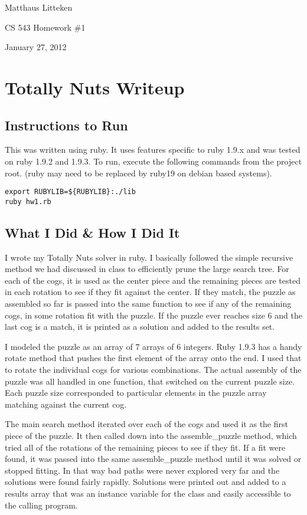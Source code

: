 \documentclass{article}
\begin{document}
\hfill Matthaus Litteken

\hfill CS 543 Homework \#1

\hfill January 27, 2012\\
\section{Totally Nuts Writeup}
\subsection{Instructions to Run}
This was written using ruby. It uses features specific to ruby 1.9.x and was tested on ruby 1.9.2 and 1.9.3. To run, execute the following commands from the project root. (ruby may need to be replaced by ruby19 on debian based systems).
\begin{verbatim}
export RUBYLIB=${RUBYLIB}:./lib
ruby hw1.rb
\end{verbatim}
\subsection{What I Did \& How I Did It}
I wrote my Totally Nuts solver in ruby. I basically followed the simple recursive method we had discussed in class to efficiently prune the large search tree. For each of the cogs, it is used as the center piece and the remaining pieces are tested in each rotation to see if they fit against the center. If they match, the puzzle as assembled so far is passed into the same function to see if any of the remaining cogs, in some rotation fit with the puzzle. If the puzzle ever reaches size 6 and the last cog is a match, it is printed as a solution and added to the results set.

I modeled the puzzle as an array of 7 arrays of 6 integers. Ruby 1.9.3 has a handy rotate method that pushes the first element of the array onto the end. I used that to rotate the individual cogs for various combinations. The actual assembly of the puzzle was all handled in one function, that switched on the current puzzle size. Each puzzle size corresponded to particular elements in the puzzle array matching against the current cog.

The main search method iterated over each of the cogs and used it as the first piece of the puzzle. It then called down into the assemble\_puzzle method, which tried all of the rotations of the remaining pieces to see if they fit. If a fit were found, it was passed into the same assemble\_puzzle method until it was solved or stopped fitting. In that way bad paths were never explored very far and the solutions were found fairly rapidly. Solutions were printed out and added to a results array that was an instance variable for the class and easily accessible to the calling program.
\end{document}
